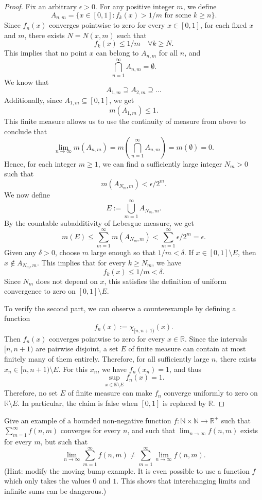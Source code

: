 \begin{proof}
   Fix an arbitrary $\epsilon > 0$. For any positive integer $m$, we define
   \[
   A_{n,m} = \{x \in [0,1] : f_k(x) > 1/m \text{ for some } k \ge n\}.
   \]
   Since $f_n(x)$ converges pointwise to zero for every $x \in [0,1]$, for each fixed $x$ and $m$, there exists $N=N(x,m)$ such that
   \[
   f_k(x) \le 1/m \quad \forall k \ge N.
   \]
   This implies that no point $x$ can belong to $A_{n,m}$ for all $n$, and
   \[
   \bigcap_{n=1}^\infty A_{n,m} = \emptyset.
   \]
   We know that
   \[
   A_{1,m} \supseteq A_{2,m} \supseteq \dots
   \]
   Additionally, since $A_{1,m} \subseteq [0,1]$, we get
   \[
   m(A_{1,m}) \le 1.
   \]
   This finite measure allows us to use the continuity of measure from above to conclude that
   \[
   \lim_{n \to \infty} m(A_{n,m}) = m\left(\bigcap_{n=1}^\infty A_{n,m}\right) = m(\emptyset) = 0.
   \]
   Hence, for each integer $m \geq 1$, we can find a sufficiently large integer $N_m > 0$ such that
   \[
   m(A_{N_m, m}) < \epsilon/2^m.
   \]
   We now define
   \[
   E := \bigcup_{m=1}^\infty A_{N_m, m}.
   \]
   By the countable subadditivity of Lebesgue measure, we get
   \[
   m(E) \le \sum_{m=1}^\infty m(A_{N_m, m}) < \sum_{m=1}^\infty \epsilon/2^m = \epsilon.
   \]
   Given any $\delta>0$, choose $m$ large enough so that $1/m<\delta$. If $x \in [0,1] \setminus E$, then $x \notin A_{N_m, m}$. This implies that for every $k \ge N_m$, we have
   \[
   f_k(x) \le 1/m < \delta.
   \]
   Since $N_m$ does not depend on $x$, this satisfies the definition of uniform convergence to zero on $[0,1] \setminus E$.

   To verify the second part, we can observe a counterexample by defining a function
   \[
   f_n(x) := \chi_{[n, n+1)}(x).
   \]
   Then $f_n(x)$ converges pointwise to zero for every $x \in \mathbb{R}$. Since the intervals $[n,n+1)$ are pairwise disjoint, a set $E$ of finite measure can contain at most finitely many of them entirely. Therefore, for all sufficiently large $n$, there exists $x_n\in[n,n+1)\setminus E$. For this $x_n$, we have $f_n(x_n)=1$, and thus
   \[
   \sup_{x\in\mathbb R\setminus E} f_n(x)=1.
   \]
   Therefore, no set $E$ of finite measure can make $f_n$ converge uniformly to zero on $\mathbb R\setminus E$. In particular, the claim is false when $[0,1]$ is replaced by $\mathbb R$.
\end{proof}

\begin{problem}
    Give an example of a bounded non-negative function $f:\mathbb{N}\times\mathbb{N}\to\mathbb{R}^+$ such that $\sum_{m=1}^\infty f(n,m)$ converges for every $n$, and such that $\lim_{n\to\infty} f(n,m)$ exists for every $m$, but such that
$$
\lim_{n\to\infty}\sum_{m=1}^\infty f(n,m) \ne \sum_{m=1}^\infty \lim_{n\to\infty} f(n,m).
$$
(Hint: modify the moving bump example.
It is even possible to use a function $f$ which only takes the values $0$ and $1$.
This shows that interchanging limits and infinite sums can be dangerous.)
\end{problem}

